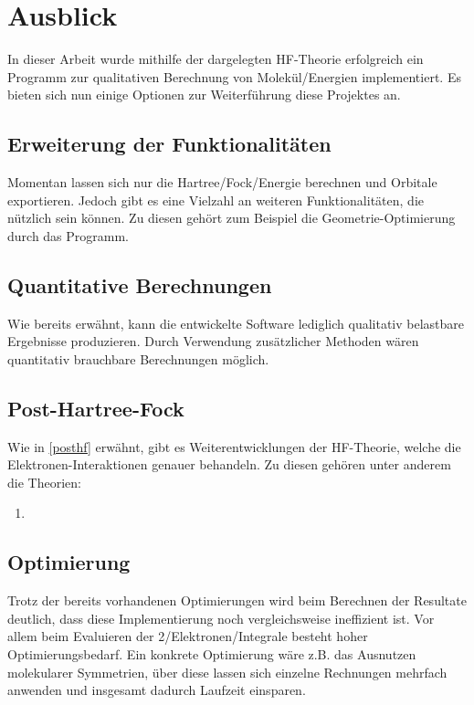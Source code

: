 \chapter{Ausblick}

In dieser Arbeit wurde mithilfe der dargelegten HF-Theorie
erfolgreich ein Programm zur qualitativen Berechnung von Molekül\-/Energien
implementiert. Es bieten sich nun einige Optionen zur Weiterführung diese Projektes an.

\section{Erweiterung der Funktionalitäten}
Momentan lassen sich nur die Hartree\-/Fock\-/Energie berechnen und Orbitale exportieren.
Jedoch gibt es eine Vielzahl an weiteren Funktionalitäten, die nützlich sein können.
Zu diesen gehört zum Beispiel die Geometrie-Optimierung durch das Programm. 

\section{Quantitative Berechnungen}
Wie bereits erwähnt, kann die entwickelte Software 
lediglich qualitativ belastbare Ergebnisse produzieren.
Durch Verwendung zusätzlicher Methoden wären
quantitativ brauchbare Berechnungen möglich.

\section{Post-Hartree-Fock}
Wie in \cref{posthf} erwähnt, gibt es Weiterentwicklungen der HF-Theorie,
welche die Elektronen-Interaktionen genauer behandeln.
Zu diesen gehören unter anderem die Theorien:
\begin{enumerate}
    \item 
\end{enumerate}

\section{Optimierung}
Trotz der bereits vorhandenen Optimierungen wird beim Berechnen der Resultate deutlich,
dass diese Implementierung noch vergleichsweise ineffizient ist. Vor allem beim Evaluieren
der 2\-/Elektronen\-/Integrale besteht hoher Optimierungsbedarf. Ein konkrete Optimierung wäre z.B.
das Ausnutzen molekularer Symmetrien, über diese lassen sich einzelne Rechnungen mehrfach anwenden
und insgesamt dadurch Laufzeit einsparen.